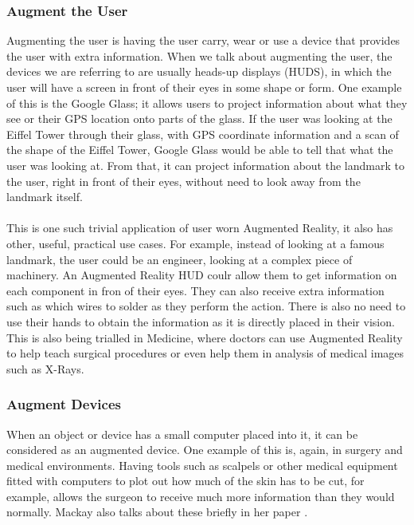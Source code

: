 \documentclass[11pt]{article}
\begin{document}
\subsubsection{Augment the User} 
Augmenting the user is having the user carry, wear or use a device
that provides the user with extra information. When we talk about augmenting
the user, the devices we are referring to are usually
heads-up displays (HUDS), in which the user will have a screen in front of their
eyes in some shape or form. One example of this is the Google Glass; it allows
users to project information about what they see or their GPS location onto
parts of the glass. If the user was looking at the Eiffel Tower through their 
glass, with GPS coordinate information and a scan of the shape of the Eiffel Tower, 
Google Glass would be able to tell that what the user was looking at. From that,
it can project information about the landmark to the user, right in
front of their eyes, without need to look away from the landmark itself.\\
\\
This is one such trivial application of
user worn Augmented Reality, it also has other, useful, practical use cases. 
For example, instead of 
looking at a famous landmark, the user could be an engineer, looking at a 
complex piece of machinery. An Augmented Reality HUD coulr allow them to get information 
on each component in fron of their eyes. They can also receive extra
information such as which wires to solder as they perform the action. 
There is also no need to use their hands to obtain the information as it
is directly placed in their vision.
This is also being trialled in Medicine, where doctors can use
Augmented Reality to help teach surgical procedures or even help them in
analysis of medical images such as X-Rays.

\subsubsection{Augment Devices} 
When an object or device has a small computer placed into it, it can be 
considered as an augmented device. One example of this is, again, in 
surgery and medical environments. Having tools such as scalpels or other 
medical equipment fitted with computers to plot out how much of the skin has
to be cut, for example, allows the surgeon to receive much more information
than they would normally. Mackay also talks about these briefly 
in her paper \cite{Mackay}.
\end{document}
